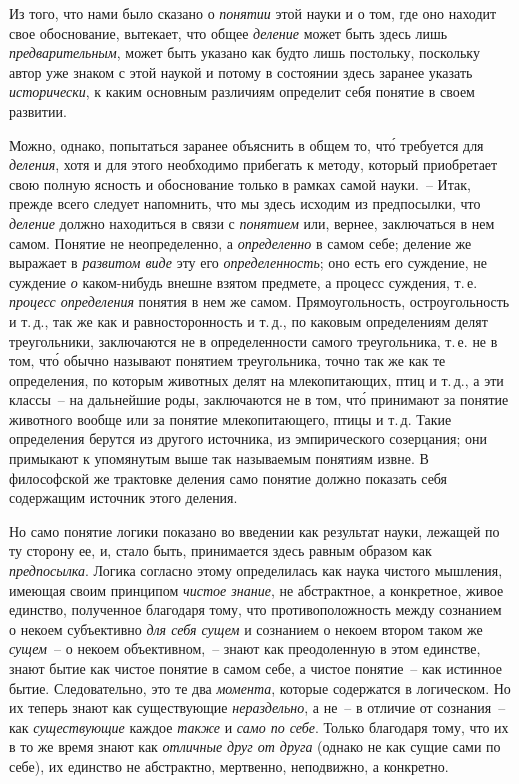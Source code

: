 Из того, что нами было сказано о \emph{понятии} этой науки
и о том, где оно находит свое обоснование, вытекает, что
общее \emph{деление} может быть здесь лишь \emph{предварительным},
может быть указано как будто лишь постольку, поскольку
автор уже знаком с этой наукой и потому в состоянии
здесь заранее указать \emph{исторически}, к каким
основным различиям определит себя понятие в своем
развитии.

Можно, однако, попытаться заранее объяснить в общем
то, чт\'о требуется для \emph{деления}, хотя и для этого
необходимо прибегать к методу, который приобретает
свою полную ясность и обоснование только в рамках
самой науки.~-- Итак, прежде всего следует напомнить,
что мы здесь исходим из предпосылки, что \emph{деление} должно
находиться в связи с \emph{понятием} или, вернее, заключаться
в нем самом. Понятие не неопределенно, а \emph{определенно}
в самом себе; деление же выражает в \emph{развитом
виде} эту его \emph{определенность}; оно есть его суждение\endnotemark{},
не суждение \emph{о} каком-нибудь внешне взятом предмете,
а процесс суждения, т.\,е. \emph{процесс определения} понятия
в нем же самом. Прямоугольность, остроугольность и т.\,д.,
так же как и равносторонность и т.\,д., по каковым определениям
делят треугольники, заключаются не в определенности
самого треугольника, т.\,е. не в том, чт\'о обычно
называют понятием треугольника, точно так же как те
определения, по которым животных делят на млекопитающих,
птиц и т.\,д., а эти классы~-- на дальнейшие
роды, заключаются не в том, чт\'о принимают за понятие
животного вообще или за понятие млекопитающего, птицы
и т.\,д. Такие определения берутся из другого источника,
из эмпирического созерцания; они примыкают
к упомянутым выше так называемым понятиям извне.
В философской же трактовке деления само понятие должно
показать себя содержащим источник этого деления.


Но само понятие логики показано во введении как
результат науки, лежащей по ту сторону ее, и, стало
быть, принимается здесь равным образом как \emph{предпосылка}.
Логика согласно этому определилась как наука
чистого мышления, имеющая своим принципом \emph{чистое
знание}, не абстрактное, а конкретное, живое единство,
полученное благодаря тому, что противоположность между
сознанием о некоем субъективно \emph{для себя сущем} и
сознанием о некоем втором таком же \emph{сущем}~-- о некоем
объективном,~-- знают как преодоленную в этом единстве,
знают бытие как чистое понятие в самом себе, а чистое
понятие~-- как истинное бытие. Следовательно, это те два
\emph{момента}, которые содержатся в логическом. Но их теперь
знают как существующие \emph{нераздельно}, а не~-- в отличие
от сознания~-- как \emph{существующие} каждое \emph{также} и \emph{само
по себе}. Только благодаря тому, что их в то же время
знают как \emph{отличные друг от друга} (однако не как сущие
сами по себе), их единство не абстрактно, мертвенно, неподвижно,
а конкретно.

